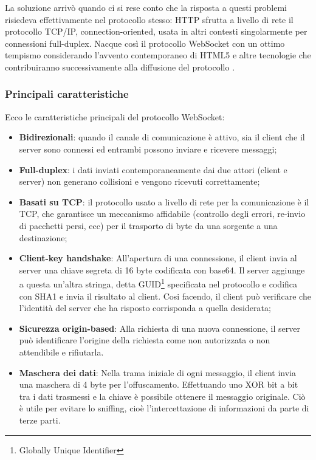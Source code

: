 \medskip

La soluzione arrivò quando ci si rese conto che la risposta a questi problemi risiedeva effettivamente nel protocollo stesso: HTTP sfrutta a livello di rete il protocollo TCP/IP, connection-oriented, usata in altri contesti singolarmente per connessioni full-duplex. Nacque così il protocollo WebSocket con un ottimo tempismo considerando l’avvento contemporaneo di HTML5 e altre tecnologie che contribuiranno successivamente alla diffusione del protocollo \cite{websocket_hystory}.

\medskip

\subsubsection{Principali caratteristiche}

Ecco le caratteristiche principali del protocollo WebSocket:
\begin{itemize}
    \item \textbf{Bidirezionali}: quando il canale di comunicazione è attivo, sia il client che il server sono connessi ed entrambi possono inviare e ricevere messaggi;
    \item \textbf{Full-duplex}: i dati inviati contemporaneamente dai due attori (client e server) non generano collisioni e vengono ricevuti correttamente;
    \item \textbf{Basati su TCP}: il protocollo usato a livello di rete per la comunicazione è il TCP, che garantisce un meccanismo affidabile (controllo degli errori, re-invio di pacchetti persi, ecc) per il trasporto di byte da una sorgente a una destinazione;
    \item \textbf{Client-key handshake}: All’apertura di una connessione, il client invia al server una chiave segreta di 16 byte codificata con base64. Il server aggiunge a questa un’altra stringa, detta GUID\footnote{Globally Unique Identifier} specificata nel protocollo e codifica con SHA1 e invia il risultato al client. Cosi facendo, il client può verificare che l’identità del server che ha risposto corrisponda a quella desiderata;
    \item \textbf{Sicurezza origin-based}: Alla richiesta di una nuova connessione, il server può identificare l’origine della richiesta come non autorizzata o non attendibile e rifiutarla.
    \item \textbf{Maschera dei dati}: Nella trama iniziale di ogni messaggio, il client invia una maschera di 4 byte per l’offuscamento. Effettuando uno XOR bit a bit tra i dati trasmessi e la chiave è possibile ottenere il messaggio originale. Ciò è utile per evitare lo sniffing, cioè l’intercettazione di informazioni da parte di terze parti.
\end{itemize}

